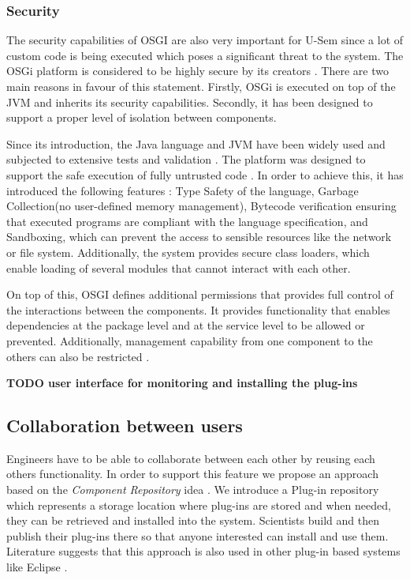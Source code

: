 \subsubsection{Security}

The security capabilities of OSGI are also very important for U-Sem since a lot of custom code is being executed which poses a significant threat to the system. The OSGi platform is considered to be highly secure by its creators \cite{parrend2009security}. There are two main reasons in favour of this statement. Firstly, OSGi is executed on top of the JVM and inherits its security capabilities. Secondly, it has been designed to support a proper level of isolation between components.

Since its introduction, the Java language and JVM have been widely used and subjected to extensive tests and validation \cite{parrend2009security}. The platform was designed to support the safe execution of fully untrusted code \cite{dean1996java}. In order to achieve this, it has introduced the following features \cite{gong2003inside}: Type Safety of the language, Garbage Collection(no user-defined memory management), Bytecode verification ensuring that executed programs are compliant with the language specification, and Sandboxing, which can prevent the access to sensible resources like the network or file system. Additionally, the system provides secure class loaders, which enable loading of several modules that cannot interact with each other.

On top of this, OSGI defines additional permissions that provides full control of the interactions between the components. It provides functionality that enables dependencies at the package level and at the service level to be allowed or prevented. Additionally, management capability from one component to the others can also be restricted \cite{parrend2009security}.

\textbf{TODO user interface for monitoring and installing the plug-ins}

\subsection{Collaboration between users}

Engineers have to be able to collaborate between each other by reusing each others functionality. In order to support this feature we propose an approach based on the \textit{Component Repository} idea \cite{seacord1999software}. We introduce a Plug-in repository which represents a storage location where plug-ins are stored and when needed, they can be retrieved and installed into the system. Scientists build and then publish their plug-ins there so that anyone interested can install and use them. Literature suggests that this approach is also used in other plug-in based systems like Eclipse \cite{mcaffer2010eclipse}.

